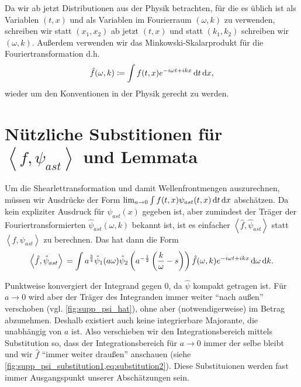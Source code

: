 
\begin{remark}[Notation]
    Da wir ab jetzt Distributionen aus der Physik betrachten, für die es üblich ist als Variablen $(t, x)$ und als Variablen im Fourierraum $(\omega, k)$ zu verwenden, schreiben wir statt $(x_1, x_2)$ ab jetzt $(t,x)$ und statt $(k_1, k_2)$ schreiben wir $(\omega, k)$. Außerdem verwenden wir das Minkowski-Skalarprodukt für die Fouriertransformation d.h.
    \begin{equation*}
        \hat f (\omega, k) \coloneqq \int f(t,x) e^{-i\omega t + i k x}
        \mathop{}\!\mathrm{d} t \mathop{}\!\mathrm{d} x
        ,
    \end{equation*}
    wieder um den Konventionen in der Physik gerecht zu werden.
\end{remark}

\section{\texorpdfstring{Nützliche Substitionen für  $\left<f, \psi_{ast}\right>$ und Lemmata}{Nützliche Substitutionen und Lemmata}}
\label{sec:substitutionen}

Um die Shearlettransformation und damit Wellenfrontmengen auszurechnen, müssen wir Ausdrücke der Form \(\lim_{a \to 0} \int f (t,x) \psi_{ast}(t,x) \mathop{}\!\mathrm{d} t \mathop{}\!\mathrm{d} x\) abschätzen. Da kein expliziter Ausdruck für $\psi_{ast}(x)$ gegeben ist, aber zumindest der Träger der Fouriertransformierten \(\hat \psi_{ast} (\omega, k)\) bekannt ist, ist es einfacher \(\left<\hat f, \hat \psi_{ast}\right>\) statt \(\left< f, \psi_{ast} \right>\) zu berechnen. Das hat dann die Form
\begin{equation}
    \left< \hat f, \hat\psi_{ast}\right> \\
    = \int a^{\frac{3}{4}} \hat \psi_1(a \omega)
    \hat \psi_2 \left(a^{-\frac{1}{2}} \left(\frac{k}{\omega} - s\right)\right)
    \hat f (\omega,k) e^{-i \omega t + ikx} \mathop{}\!\mathrm{d} \omega \mathop{}\!\mathrm{d} k.
\end{equation}

Punktweise konvergiert der Integrand gegen 0, da $\hat \psi$ kompakt getragen ist. Für $a \to 0$ wird aber der Träger des Integranden immer weiter "`nach außen"' verschoben (vgl. \cref{fig:supp_psi_hat}), ohne aber (notwendigerweise) im Betrag abzunehmen. Deshalb existiert auch keine integrierbare Majorante, die unabhängig von $a$ ist. Also verschieben wir den Integrationsbereich mittels Substitution so, dass der Integrationsbereich für $a \to 0$ immer der selbe bleibt und wir $\hat f$ "`immer weiter draußen"' anschauen (siehe \cref{fig:supp_psi_substitution1,eq:substitution2}). Diese Substituionen werden fast immer Ausgangspunkt unserer Abschätzungen sein.

